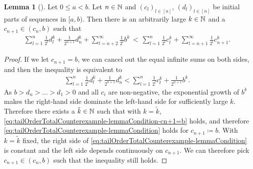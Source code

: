 \documentclass[a4paper,DIV=11]{scrreprt}
\theoremstyle{definition}
\newtheorem{lemma}[thm]{Lemma} %
\begin{document}
    \begin{lemma}[{\cite{bib:epperleinTailOrderTotalCounterexample}}]
        \label{lem:tailOrderTotalCounterexample-lemmaCondition}
        Let $0 \leq a < b$. Let $n \in \mathbb{N}$ and $(c_l)_{l \in [n]}$, $(d_l)_{l \in [n]}$ be initial parts of sequences in $[a, b)$.
        Then there is an arbitrarily large $k \in \mathbb{N}$ and a $c_{n+1} \in (c_n, b)$ such that
        \begin{gather}
            \sum_{l=1}^{n} \frac{1}{2^l} d_l^k + \frac{1}{2^{n+1}} d_n^k + \sum_{l = n+2}^{\infty} \frac{1}{2^l} b^k
            \,<\, \sum_{l=1}^{n} \frac{1}{2^l} c_l^k + \sum_{l = n+1}^{\infty} \frac{1}{2^l} c_{n+1}^k.
            \label{eq:tailOrderTotalCounterexample-lemmaCondition}
        \end{gather}
    \end{lemma}
    \begin{proof}
        If we let $c_{n+1} = b$, we can cancel out the equal infinite sums on both sides, and then the inequality is equivalent to
        \begin{gather}
            \sum_{l=1}^{n} \frac{1}{2^l} d_l^k + \frac{1}{2^{n+1}} d_n^k
            < \sum_{l=1}^{n} \frac{1}{2^l} c_l^k + \frac{1}{2^{n+1}} b^k.
            \label{eq:tailOrderTotalCounterexample-lemmaCondition-cn+1=b}
        \end{gather}
        As $b > d_n > \dots > d_1 > 0$ and all $c_i$ are non-negative, the exponential growth of $b^k$ makes the right-hand side dominate the left-hand side for sufficiently large $k$.
        Therefore there exists a $\tilde{k} \in \mathbb{N}$ such that with $k = \tilde{k}$, \eqref{eq:tailOrderTotalCounterexample-lemmaCondition-cn+1=b} holds, and therefore \eqref{eq:tailOrderTotalCounterexample-lemmaCondition} holds for $c_{n+1} \coloneqq b$.
        With $k = \tilde{k}$ fixed, the right side of \eqref{eq:tailOrderTotalCounterexample-lemmaCondition} is constant and the left side depends continuously on $c_{n+1}$. We can therefore pick $c_{n+1} \in (c_n, b)$ such that the inequality still holds.
    \end{proof}
    
\end{document}
